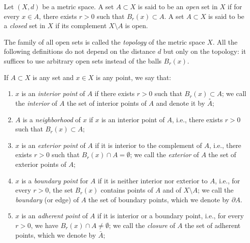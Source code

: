 \begin{definition}%
\mymark{*}%
\label{def:466342}%
Let $(X,d)$ be a metric space.
A set $A\subset X$ is said to be an
\emph{open}%
%
 set in $X$ if for every $x\in A$, there exists $r>0$
such that $B_r(x) \subset A$.
A set $A\subset X$ is said to be a
\emph{closed}%
%
 set in $X$ if its complement $X\setminus A$ is open.

The family of all open sets is called the \emph{topology}%
%
 of the metric space $X$. 
All the following definitions do not depend on the distance $d$ but only on the
topology:
it suffices to use arbitrary open sets instead of the balls $B_r(x)$.

If $A\subset X$ is any set
and $x\in X$ is any point, we say that:
\begin{enumerate}
\item
$x$ is an \emph{interior point}%
%
 of $A$ if there exists $r>0$ such that $B_r(x) \subset A$;
we call the
\emph{interior}%
%
of $A$ the set of interior points of $A$
and denote it by $\stackrel\circ A$;
\item
$A$ is a \emph{neighborhood}%
%
 of $x$ if $x$ is an interior point of $A$,
i.e., there exists $r>0$ such that $B_r(x)\subset A$;
\item
$x$ is an \emph{exterior point}%
%
 of $A$ if it is interior to the complement of $A$, i.e., there exists $r>0$ such that $B_r(x) \cap A = \emptyset$;
we call the \emph{exterior}%
%
 of $A$ the set of exterior points of $A$;
\item
$x$ is a \emph{boundary point}%
%
 for $A$ if it is neither interior nor exterior to $A$, i.e., for every $r>0$, the set $B_r(x)$ contains points of $A$ and of $X\setminus A$;
we call the \emph{boundary}%
%
 (or edge) of $A$ the set of boundary points, which we denote by $\partial A$.
\item
$x$ is an \emph{adherent point}%
%
 of $A$ if it is interior or a boundary point, i.e., for every $r>0$, we have $B_r(x) \cap A \neq \emptyset$;
we call the \emph{closure} of $A$ the set of adherent points,
which we denote by $\bar A$;
%

\end{enumerate}
\end{definition}
